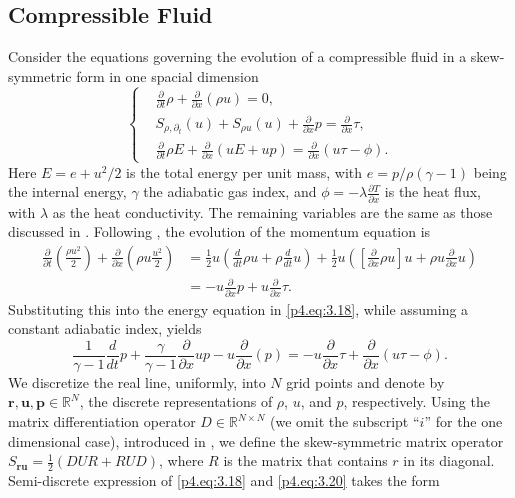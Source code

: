 \subsection{Compressible Fluid} \label{p4.sec:skew.3}
Consider the equations governing the evolution of a compressible fluid in a skew-symmetric form in one spacial dimension
\begin{equation} \label{p4.eq:3.18}
\left\{
\begin{aligned}
	&\frac{\partial}{\partial t} \rho + \frac{\partial }{\partial x}(\rho u) = 0, \\ 
	& S_{\rho,\partial_t}(u)+ S_{\rho u}(u) + \frac{\partial }{\partial x} p = \frac{\partial }{\partial x} \tau, \\
	&\frac{\partial}{\partial t} \rho E + \frac{\partial}{\partial x}(u E + up) = \frac{\partial }{\partial x}(u\tau - \phi).
\end{aligned}
\right.
\end{equation}
Here $E= e + u^2/2$ is the total energy per unit mass, with $e = {p}/{\rho(\gamma - 1)}$ being the internal energy, $\gamma$ the adiabatic gas index, and $\phi = -\lambda \frac{\partial T}{\partial x}$ is the heat flux, with $\lambda$ as the heat conductivity. The remaining variables are the same as those discussed in . Following \cite{reiss2014conservative}, the evolution of the momentum equation is
\begin{equation} \label{p4.eq:3.19}
	\begin{aligned}
	\frac{\partial}{\partial t}(\frac{\rho u^2}{2}) + \frac{\partial }{\partial x}(\rho u \frac{u^2}{2}) &= \frac 1 2 u( \frac{d}{dt} \rho u + \rho \frac{d}{dt} u ) + \frac 1 2 u ( [ \frac{\partial}{\partial x} \rho u ] u + \rho u \frac{\partial }{\partial x} u ) \\
	& = - u \frac{\partial}{\partial x} p + u \frac{\partial}{\partial x} \tau.
	\end{aligned}
\end{equation}
Substituting this into the energy equation in \eqref{p4.eq:3.18}, while assuming a constant adiabatic index, yields
\begin{equation} \label{p4.eq:3.20}
	\frac{1}{\gamma -1} \frac{d}{dt} p + \frac{\gamma}{\gamma -1} \frac{\partial }{\partial x} up - u \frac{\partial }{\partial x}(p) = - u \frac{\partial}{\partial x} \tau + \frac{\partial }{\partial x}(u\tau - \phi).
\end{equation}
We discretize the real line, uniformly, into $N$ grid points and denote by $\mathbf r, \mathbf u, \mathbf p \in \mathbb R^{N}$, the discrete representations of $\rho$, $u$, and $p$, respectively. Using the matrix differentiation operator $D\in \mathbb R^{N\times N}$ (we omit the subscript ``$i$'' for the one dimensional case), introduced in , we define the skew-symmetric matrix operator $S_{\mathbf r \mathbf u} = \frac 1 2 (DUR + RUD)$, where $R$ is the matrix that contains $r$ in its diagonal. Semi-discrete expression of \eqref{p4.eq:3.18} and \eqref{p4.eq:3.20} takes the form
